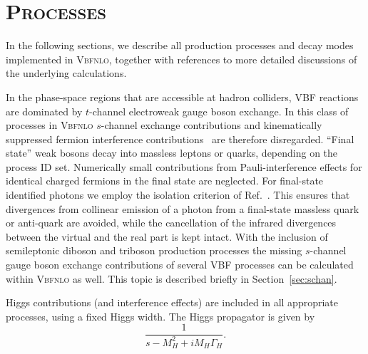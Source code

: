 \documentclass[english,12pt]{article}
\begin{document}
\newpage

\section{\textsc{Processes}}
\label{sec:proc}
In the following sections, we describe all production processes and decay
modes implemented in \textsc{Vbfnlo}, together with references to more
detailed discussions of the underlying calculations.

In the phase-space regions that are accessible at hadron colliders, VBF
reactions are dominated by $t$-channel electroweak gauge boson exchange. In this
class of processes in \textsc{Vbfnlo} $s$-channel exchange contributions and
kinematically suppressed fermion interference
contributions~\cite{CO,Andersen:2007mp,Bredenstein:2008tm} are therefore
disregarded.  ``Final state'' weak bosons decay into massless leptons or
quarks, depending on the process ID set.
Numerically small contributions from Pauli-interference effects for identical
charged fermions in the final state are neglected.   For final-state identified photons we employ
the isolation criterion of Ref.~\cite{Frixione:1998jh}. This ensures that
divergences from collinear emission of a photon from a final-state massless
quark or anti-quark are avoided, while the cancellation of the infrared
divergences between the virtual and the real part is kept intact.
With the inclusion of semileptonic diboson and triboson production processes
the missing $s$-channel gauge boson exchange contributions of several VBF processes
can be calculated within \textsc{Vbfnlo} as well. This topic is described
briefly in Section~\ref{sec:schan}.

Higgs contributions (and interference effects) are included in all appropriate
processes, using a fixed Higgs width.  The Higgs propagator is given by
\begin{equation}
 \frac{1}{s - M_{H}^{2} + i M_{H} \Gamma_{H}} .
\end{equation}
\end{document}
